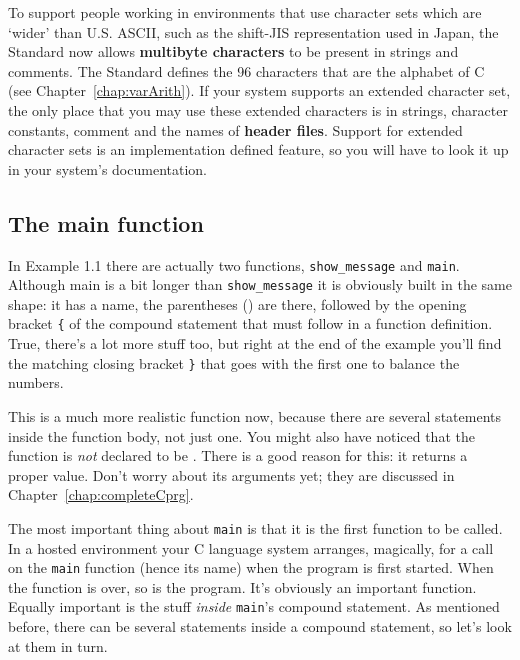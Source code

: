    To support people working in environments that use character sets which
    are `wider' than U.S. ASCII, such as the shift-JIS representation
    used in Japan, the Standard now allows \textbf{multibyte characters} to
    be present in strings and comments. The Standard defines the
    96 characters that are the alphabet of C (see Chapter~\ref{chap:varArith}).
    If your system supports an extended character set, the only
    place that you may use these extended characters is in strings, character
    constants, comment and the names of \textbf{header files}. Support for
    extended character sets is an implementation defined feature, so you will
    have to look it up in your system's documentation.


  

  \subsection{The main function}
   

   In Example 1.1 there are actually two functions,
    \texttt{show\_message} and \texttt{main}. Although main is a bit
    longer than \texttt{show\_message} it is obviously built in the same
    shape: it has a name, the parentheses () are there, followed by the opening
    bracket \texttt{\{} of the compound statement that must follow in a
    function definition. True, there's a lot more stuff too, but right at the
    end of the example you'll find the matching closing bracket \texttt{\}}
    that goes with the first one to balance the numbers.


   This is a much more realistic function now, because there are several
    statements inside the function body, not just one. You might also have
    noticed that the function is \textit{not} declared to be
    \void. There is a good reason for this: it returns a proper
    value. Don't worry about its arguments yet; they are discussed in
    Chapter~\ref{chap:completeCprg}.


   The most important thing about \texttt{main} is that it is the first
    function to be called. In a hosted environment your C language system
    arranges, magically, for a call on the \texttt{main} function (hence
    its name) when the program is first started. When the function is over, so
    is the program. It's obviously an important function. Equally important is
    the stuff \textit{inside} \texttt{main}'s compound statement. As
    mentioned before, there can be several statements inside a compound
    statement, so let's look at them in turn.


